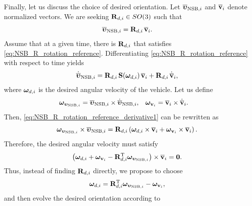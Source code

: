 Finally, let us discuss the choice of desired orientation.
Let $\overline{\bm{\upsilon}}_{{\rm NSB}, i}$ and $\overline{\mathbf{v}}_{i}$ denote normalized vectors.
We are seeking $\mathbf{R}_{d, i} \in SO(3)$ such that 
\begin{equation}
    \overline{\bm{\upsilon}}_{{\rm NSB}, i} = \mathbf{R}_{d, i}\,\overline{\mathbf{v}}_{i}.
    \label{eq:NSB_R_rotation_reference}
\end{equation}
Assume that at a given time, there is $\mathbf{R}_{d, i}$ that satisfies \eqref{eq:NSB_R_rotation_reference}.
Differentiating \eqref{eq:NSB_R_rotation_reference} with respect to time yields 
\begin{equation}
    \dot{\overline{\bm{\upsilon}}}_{{\rm NSB}, i} = \mathbf{R}_{d, i}\,\mathbf{S}(\bm{\omega}_{d, i})\,\overline{\mathbf{v}}_{i} + \mathbf{R}_{d, i}\,\dot{\overline{\mathbf{v}}}_{i},
    \label{eq:NSB_R_rotation_reference_derivative1}
\end{equation}
where $\bm{\omega}_{d, i}$ is the desired angular velocity of the vehicle.     
Let us define
\begin{align}
    \bm{\omega}_{\bm{\upsilon}_{{\rm NSB}, i}} &= \overline{\bm{\upsilon}}_{{\rm NSB}, i} \times \dot{\overline{\bm{\upsilon}}}_{{\rm NSB}, i}, &
    \bm{\omega}_{\mathbf{v}_{i}} &= \overline{\mathbf{v}}_{i} \times \dot{\overline{\mathbf{v}}}_{i}.
    \label{eq:NSB_R_omega_v}
\end{align}    
Then, \eqref{eq:NSB_R_rotation_reference_derivative1} can be rewritten as 
\begin{equation}
    \bm{\omega}_{\bm{\upsilon}_{{\rm NSB}, i}} \times \overline{\bm{\upsilon}}_{{\rm NSB}, i} = 
    \mathbf{R}_{d, i} \left( \bm{\omega}_{d, i} \times \overline{\mathbf{v}}_{i} + \bm{\omega}_{\mathbf{v}_{i}} \times \overline{\mathbf{v}}_{i} \right).
\end{equation}
Therefore, the desired angular velocity must satisfy 
\begin{equation}
    \left( \bm{\omega}_{d, i} + \bm{\omega}_{\mathbf{v}_{i}} 
    - \mathbf{R}_{d, i}^{\mathrm{T}} \bm{\omega}_{\bm{\upsilon}_{{\rm NSB}, i}} \right) \times \overline{\mathbf{v}}_{i} = \mathbf{0}. \label{eq:NSB_R_omega_ref_equation}
\end{equation}
Thus, instead of finding $\mathbf{R}_{d, i}$ directly, we propose to choose 
\begin{equation}
    \bm{\omega}_{d, i} = \mathbf{R}_{d, i}^{\mathrm{T}} \bm{\omega}_{\bm{\upsilon}_{{\rm NSB}, i}} - \bm{\omega}_{\mathbf{v}_{i}},
    \label{eq:NSB_R_omega_ref}
\end{equation}
and then evolve the desired orientation according to 
